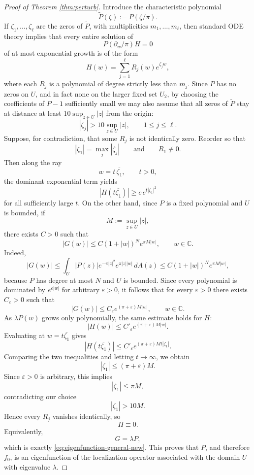 \documentclass[a4paper,11pt,reqno]{amsart}
\numberwithin{equation}{section}
\theoremstyle{plain} %
\theoremstyle{definition} %
\theoremstyle{remark}
\newcommand{\C}{\mathbb{C}}
\begin{document}
\begin{proof}[Proof of Theorem \ref{thm:perturb}]
Introduce the characteristic polynomial
\[
\widetilde P(\zeta):=P(\zeta/\pi).
\]
If \(\zeta_1,\dots,\zeta_\ell\) are the zeros of \(\widetilde P\), with multiplicities \(m_1,\dots,m_\ell\), then standard ODE theory implies that every entire solution of
\[
P(\partial_w/\pi)H=0
\]
of at most exponential growth is of the form
\[
H(w)=\sum_{j=1}^\ell R_j(w)e^{\zeta_j w},
\]
where each \(R_j\) is a polynomial of degree strictly less than \(m_j\). Since \(P\) has no zeros on \(U\), and in fact none on the larger fixed set \(U_2\), by choosing the coefficients of \(P-1\) sufficiently small we may also assume that all zeros of \(\widetilde P\) stay at distance at least \(10\sup_{z\in U}|z|\) from the origin:
\[
|\zeta_j|>10\sup_{z\in U}|z|,
\qquad 1\le j\le \ell.
\]
Suppose, for contradiction, that some \(R_j\) is not identically zero. Reorder so that
\[
|\zeta_1|=\max_j |\zeta_j|
\qquad\text{and}\qquad
R_1\not\equiv 0.
\]
Then along the ray
\[
w=t\,\overline{\zeta_1},
\qquad t>0,
\]
the dominant exponential term yields
\[
|H(t\overline{\zeta_1})|\ge c\,e^{t|\zeta_1|^2}
\]
for all sufficiently large \(t\). On the other hand, since \(P\) is a fixed polynomial and \(U\) is bounded, if
\[
M:=\sup_{z\in U}|z|,
\]
there exists \(C>0\) such that
\[
|G(w)|\le C(1+|w|)^N e^{\pi M|w|},
\qquad w\in \C.
\]
Indeed,
\[
|G(w)|
\le
\int_U |P(z)|e^{-\pi|z|^2}e^{\pi |z||w|}\,dA(z)
\le
C(1+|w|)^N e^{\pi M|w|},
\]
because \(P\) has degree at most \(N\) and \(U\) is bounded. Since every
polynomial is dominated by \(e^{\varepsilon |w|}\) for arbitrary
\(\varepsilon>0\), it follows that for every \(\varepsilon>0\) there exists
\(C_\varepsilon>0\) such that
\[
|G(w)|\le C_\varepsilon e^{(\pi+\varepsilon)M|w|},
\qquad w\in \C.
\]
As \(\lambda P(w)\) grows only polynomially, the same estimate holds for \(H\):
\[
|H(w)|\le C'_\varepsilon e^{(\pi+\varepsilon)M|w|}.
\]
Evaluating at \(w=t\overline{\zeta_1}\) gives
\[
|H(t\overline{\zeta_1})|
\le
C'_\varepsilon e^{(\pi+\varepsilon)Mt|\zeta_1|}.
\]
Comparing the two inequalities and letting \(t\to\infty\), we obtain
\[
|\zeta_1|\le (\pi+\varepsilon)M.
\]
Since \(\varepsilon>0\) is arbitrary, this implies
\[
|\zeta_1|\le \pi M,
\]
contradicting our choice
\[
|\zeta_1|>10M.
\]
Hence every \(R_j\) vanishes identically, so
\[
H\equiv 0.
\]
Equivalently,
\[
G=\lambda P,
\]
which is exactly \eqref{eq:eigenfunction-general-new}. This proves that \(P\), and therefore \(f_0\), is an eigenfunction of the localization operator associated with the domain \(U\) with eigenvalue \(\lambda\).
\end{proof}
\end{document}
